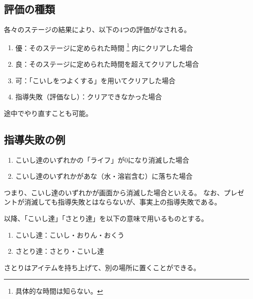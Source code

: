 \subsection{評価の種類}
各々のステージの結果により、以下の4つの評価がなされる。
\begin{enumerate}[label={\sarrow}]
\item 優：そのステージに定められた時間%
\footnote{具体的な時間は知らない。}%
内にクリアした場合
\item 良：そのステージに定められた時間を超えてクリアした場合
\item 可：「こいしをつよくする」を用いてクリアした場合
\item 指導失敗（評価なし）：クリアできなかった場合
\end{enumerate}
途中でやり直すことも可能。


\subsection{指導失敗の例}
\begin{enumerate}[label={\sarrow}]
\item こいし達のいずれかの「ライフ」が0になり消滅した場合
\item こいし達のいずれかがあな（水・溶岩含む）に落ちた場合
\end{enumerate}
つまり、こいし達のいずれかが画面から消滅した場合といえる。
なお、プレゼントが消滅しても指導失敗とはならないが、事実上の指導失敗である。
\begin{marker}
以降、「こいし達」「さとり達」を以下の意味で用いるものとする。
\begin{enumerate}[label={\sarrow}]
\item こいし達：こいし・おりん・おくう
\item さとり達：さとり・こいし達
\end{enumerate}
\end{marker}


\clearpage
さとりはアイテムを持ち上げて、別の場所に置くことができる。

